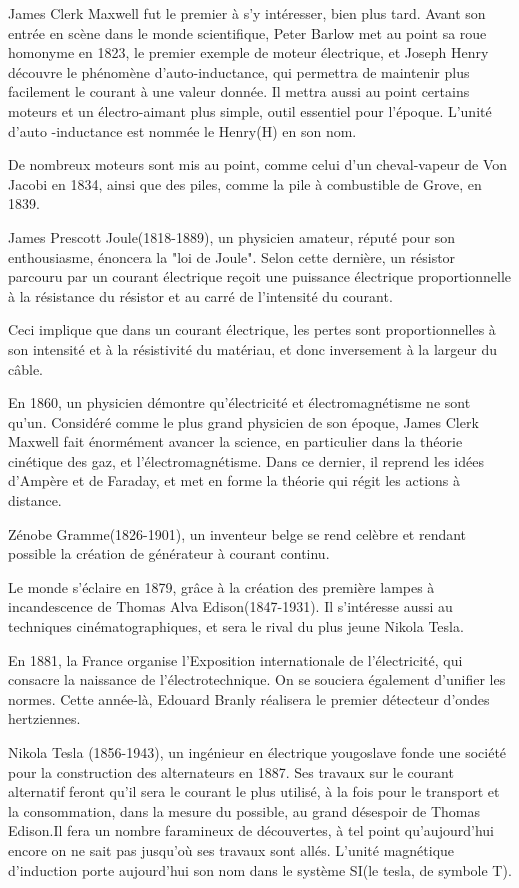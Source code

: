\documentclass[12pt]{report}
\begin{document}
James Clerk Maxwell fut le premier à s'y intéresser, bien plus tard. Avant son entrée en scène dans le monde scientifique, Peter Barlow met au point sa roue homonyme en 1823, le premier exemple de moteur électrique, et Joseph Henry découvre le phénomène d'auto-inductance, qui permettra de maintenir plus facilement le courant à une valeur donnée. Il mettra aussi au point certains moteurs et un électro-aimant plus simple, outil essentiel pour l'époque.
L'unité d'auto -inductance est nommée le Henry(H) en son nom.

  De nombreux moteurs sont mis au point, comme celui d'un cheval-vapeur de Von Jacobi en 1834, ainsi que des piles, comme la pile à combustible de Grove, en 1839.
  
James Prescott Joule(1818-1889), un physicien amateur, réputé pour son enthousiasme, énoncera la "loi de Joule". Selon cette dernière, un résistor parcouru par un courant électrique reçoit une puissance électrique proportionnelle à la résistance du résistor et au carré de l'intensité du courant. 

Ceci implique que dans un courant électrique, les pertes sont proportionnelles à son intensité et à la résistivité du matériau, et donc inversement à la largeur du câble.

En 1860, un physicien démontre qu'électricité et électromagnétisme ne sont qu'un. Considéré comme le plus grand physicien de son époque, James Clerk Maxwell fait énormément avancer la science, en particulier dans la théorie cinétique des gaz, et l'électromagnétisme. Dans ce dernier, il reprend les idées d'Ampère et de Faraday, et met en forme la théorie qui régit les actions à distance.

Zénobe Gramme(1826-1901), un inventeur belge se rend celèbre et rendant possible la création de générateur à courant continu.

Le monde s'éclaire en 1879, grâce à la création des première lampes à incandescence de Thomas Alva Edison(1847-1931). Il s'intéresse aussi au techniques cinématographiques, et sera le rival du plus jeune Nikola Tesla.

En 1881, la France organise l'Exposition internationale de l'électricité, qui consacre la naissance de l'électrotechnique. On se souciera également d'unifier les normes. Cette année-là, Edouard Branly réalisera le premier détecteur d'ondes hertziennes.

Nikola Tesla (1856-1943), un ingénieur en électrique yougoslave fonde une société pour la construction des alternateurs en 1887. Ses travaux sur le courant alternatif feront qu'il sera le courant le plus utilisé, à la fois pour le transport et la consommation, dans la mesure du possible, au grand désespoir de Thomas Edison.Il fera un nombre faramineux de découvertes, à tel point qu'aujourd'hui encore on ne sait pas jusqu'où ses travaux sont allés. L'unité magnétique d'induction porte aujourd'hui son nom dans le système SI(le tesla, de symbole T).
\end{document}
